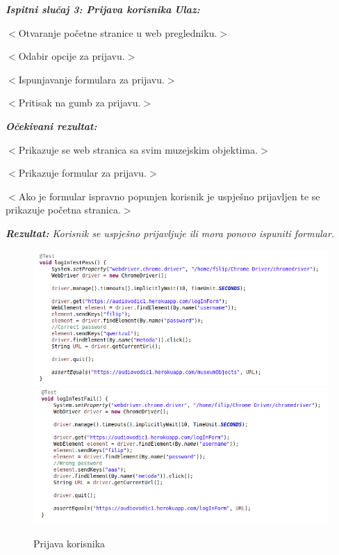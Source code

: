 	 	 
	 	 	 \textit{\textbf{Ispitni slučaj 3: Prijava korisnika}}
	 	 	 \newline
	 	 	 \textit{\textbf{Ulaz:}}
	 	 	 \begin{packed_enum}	
	 	 	 	\item $<$Otvaranje početne stranice u web pregledniku.$>$
	 	 	 	\item $<$Odabir opcije za prijavu.$>$
	 	 	 	\item $<$Ispunjavanje formulara za prijavu.$>$
	 	 	 	\item $<$Pritisak na gumb za prijavu.$>$
	 	 	 \end{packed_enum}
	 	 	 \textit{\textbf{Očekivani rezultat:}}
	 	 	 \begin{packed_enum}
	 	 	 	\item $<$Prikazuje se web stranica sa svim muzejskim objektima.$>$
	 	 	 	\item $<$Prikazuje formular za prijavu.$>$
	 	 	 	\item $<$Ako je formular ispravno popunjen korisnik je uspješno prijavljen te se prikazuje početna stranica.$>$ 
	 	 	 \end{packed_enum}
	 	 	 \textit{\textbf{Rezultat:} Korisnik se uspješno prijavljuje ili mora ponovo ispuniti formular.
	 	 	 	\newline}
	 	 	 \begin{figure}[H]
	 	 	 	\includegraphics[scale=0.25]{slike/logInTestPass.png}
	 	 	 	\includegraphics[scale=0.25]{slike/logInTestFail.png}
	 	 	 	\centering
	 	 	 	\caption{Prijava korisnika}
	 	 	 	\label{fig:promjene}
	 	 	 \end{figure}
 	 	 
